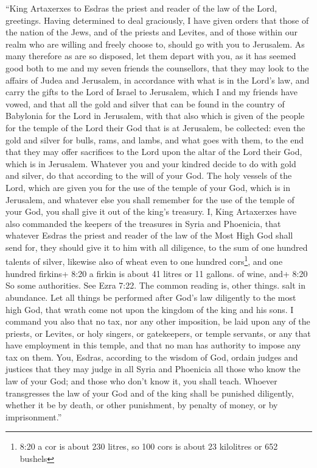  ``King Artaxerxes to Esdras the priest and reader of the
law of the Lord, greetings.  Having determined to deal
graciously, I have given orders that those of the nation of the Jews,
and of the priests and Levites, and of those within our realm who are
willing and freely choose to, should go with you to Jerusalem.
 As many therefore as are so disposed, let them depart with
you, as it has seemed good both to me and my seven friends the
counsellors,  that they may look to the affairs of Judea
and Jerusalem, in accordance with what is in the Lord's law,
 and carry the gifts to the Lord of Israel to Jerusalem,
which I and my friends have vowed, and that all the gold and silver that
can be found in the country of Babylonia for the Lord in Jerusalem,
 with that also which is given of the people for the temple
of the Lord their God that is at Jerusalem, be collected: even the gold
and silver for bulls, rams, and lambs, and what goes with them,
 to the end that they may offer sacrifices to the Lord upon
the altar of the Lord their God, which is in Jerusalem. 
Whatever you and your kindred decide to do with gold and silver, do that
according to the will of your God.  The holy vessels of the
Lord, which are given you for the use of the temple of your God, which
is in Jerusalem,  and whatever else you shall remember for
the use of the temple of your God, you shall give it out of the king's
treasury.  I, King Artaxerxes have also commanded the
keepers of the treasures in Syria and Phoenicia, that whatever Esdras
the priest and reader of the law of the Most High God shall send for,
they should give it to him with all diligence,  to the sum
of one hundred talents of silver, likewise also of wheat even to one
hundred cors\footnote{8:20 a cor is about 230 litres, so 100 cors is
  about 23 kilolitres or 652 bushels}, and one hundred firkins+ 8:20 a
firkin is about 41 litres or 11 gallons. of wine, and+ 8:20 So some
authorities. See Ezra 7:22. The common reading is, other things. salt in
abundance.  Let all things be performed after God's law
diligently to the most high God, that wrath come not upon the kingdom of
the king and his sons.  I command you also that no tax, nor
any other imposition, be laid upon any of the priests, or Levites, or
holy singers, or gatekeepers, or temple servants, or any that have
employment in this temple, and that no man has authority to impose any
tax on them.  You, Esdras, according to the wisdom of God,
ordain judges and justices that they may judge in all Syria and
Phoenicia all those who know the law of your God; and those who don't
know it, you shall teach.  Whoever transgresses the law of
your God and of the king shall be punished diligently, whether it be by
death, or other punishment, by penalty of money, or by imprisonment.''

